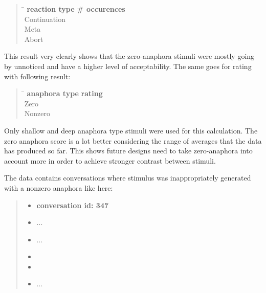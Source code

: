 \begin{quote}
\begin{tabbing}
\hspace{4cm} \= \hspace{3cm} \kill %
\textbf{reaction type} \> \textbf{\# occurences}\\
Continuation  \\
Meta  \\
Abort   \\
\end{tabbing}
\end{quote}

This result very clearly shows that the zero-anaphora stimuli were mostly going by unnoticed
and have a higher level of acceptability.
The same goes for rating with following result:

\begin{quote}
\begin{tabbing}
\hspace{4cm} \= \hspace{3cm} \kill %
\textbf{anaphora type} \> \textbf{rating}\\
Zero  \\
Nonzero  \\
\end{tabbing}
\end{quote}

Only shallow and deep anaphora type stimuli were used for this calculation.
The zero anaphora score is a lot better considering the range of averages
that the data has produced so far.
This shows future designs need to take zero-anaphora into account more
in order to achieve stronger contrast between stimuli.

The data contains conversations where stimulus was
inappropriately generated with a nonzero anaphora like here:

\begin{quote}
\begin{itemize}[label={}, leftmargin=0pt, itemsep=0.5em]
\item \textbf{conversation id: 347}
\item ...
\item {}
...
\item {}
\item {}
\item ...
\end{itemize}
\end{quote}

